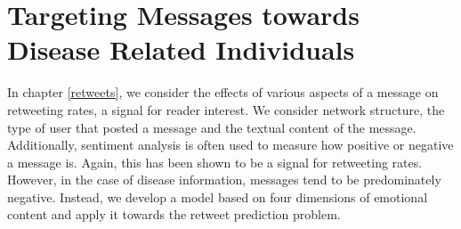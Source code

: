 \section{Targeting Messages towards Disease Related Individuals}

In chapter \ref{retweets}, we consider the effects of various aspects of a message on retweeting rates, a signal for reader interest.\cite{Suh:2010uw,Kim2012retweet,Stieglitz2012politics,gransee2012} We consider network structure, the type of user that posted a message and the textual content of the message. Additionally, sentiment analysis is often used to measure how positive or negative a message is.\cite{Kim2012retweet,Stieglitz2012politics,Zhao:2012vz,Bollen:2011wv,Ofek:ug} Again, this has been shown to be a signal for retweeting rates. However, in the case of disease information, messages tend to be predominately negative. Instead, we develop a model based on four dimensions of emotional content\cite{russell1977evidence,plutchik2001nature,Cambria2011} and apply it towards the retweet prediction problem.